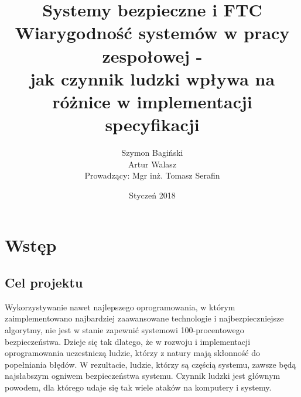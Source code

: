 \documentclass[12pt, notitlepage]{article}
\begin{document}
\begin{titlepage}
    \thispagestyle{empty}
    \title{\textbf{\Huge Systemy bezpieczne i FTC \\[1cm]\LARGE Wiarygodność systemów w pracy zespołowej - \\ jak czynnik ludzki wpływa na różnice w implementacji specyfikacji}}
    \author{Szymon Bagiński \\ Artur Walasz \\[1cm]{\small Prowadzący: Mgr inż. Tomasz Serafin}}
    \date{Styczeń 2018}
    \maketitle
    \vfill
    \vfill
\end{titlepage}    


\tableofcontents

\newpage
\section{Wstęp}

\subsection{Cel projektu}

Wykorzystywanie nawet najlepszego oprogramowania, w którym zaimplementowano najbardziej zaawansowane technologie i najbezpieczniejsze algorytmy, nie jest w stanie zapewnić systemowi 100-procentowego bezpieczeństwa. Dzieje się tak dlatego, że w rozwoju i implementacji oprogramowania uczestniczą ludzie, którzy z natury mają skłonność do popełniania błędów. W rezultacie, ludzie, którzy są częścią systemu, zawsze będą najsłabszym ogniwem bezpieczeństwa systemu. Czynnik ludzki jest głównym powodem, dla którego udaje się tak wiele ataków na komputery i systemy.
\end{document}
